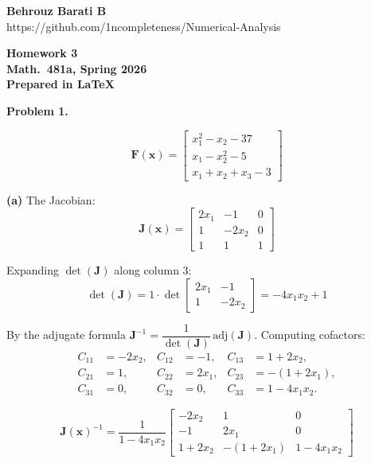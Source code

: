\documentclass[12pt,letterpaper]{article}
\begin{document}
\par
{\bfseries Behrouz Barati B} \\
https://github.com/1ncompleteness/Numerical-Analysis
\par
\begin{center}
\bfseries Homework 3 \\
\bfseries Math.~481a, Spring 2026 \\
\bfseries Prepared in \LaTeX\
\end{center}


\textbf{Problem 1.}

\[
\mathbf{F}(\mathbf{x})
= \begin{bmatrix} x_1^2 - x_2 - 37 \\ x_1 - x_2^2 - 5 \\ x_1 + x_2 + x_3 - 3 \end{bmatrix}
\]

\textbf{(a)} The Jacobian:
\[
\mathbf{J}(\mathbf{x})
= \begin{bmatrix}
2x_1 & -1 & 0 \\
1 & -2x_2 & 0 \\
1 & 1 & 1
\end{bmatrix}
\]

Expanding $\det(\mathbf{J})$ along column 3:
\[
\det(\mathbf{J}) = 1 \cdot \det\!\begin{bmatrix} 2x_1 & -1 \\ 1 & -2x_2 \end{bmatrix}
= -4x_1 x_2 + 1
\]

By the adjugate formula $\mathbf{J}^{-1} = \dfrac{1}{\det(\mathbf{J})}\,\mathrm{adj}(\mathbf{J})$. Computing cofactors:
\begin{align*}
C_{11} &= -2x_2, & C_{12} &= -1, & C_{13} &= 1 + 2x_2, \\
C_{21} &= 1, & C_{22} &= 2x_1, & C_{23} &= -(1 + 2x_1), \\
C_{31} &= 0, & C_{32} &= 0, & C_{33} &= 1 - 4x_1 x_2.
\end{align*}

\vspace{-20pt}

\[
\boxed{\mathbf{J}(\mathbf{x})^{-1}
= \frac{1}{1 - 4x_1 x_2}
\begin{bmatrix}
-2x_2 & 1 & 0 \\[3pt]
-1 & 2x_1 & 0 \\[3pt]
1 + 2x_2 & -(1 + 2x_1) & 1 - 4x_1 x_2
\end{bmatrix}}
\]
\end{document}
